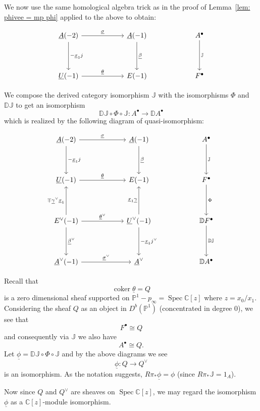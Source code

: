 \documentclass{amsart}
\theoremstyle{definition}
\newcommand{\CC} {{\mathbb C}}          %
\newcommand{\DD} {{\mathbb D}}
\newcommand{\JJ} {{\mathbb J}}
\newcommand{\PP}{\mathbb{P}}
\newcommand{\coker}{\operatorname{coker}}
\newcommand{\UL}[1]{\underline{#1}}
\newcommand{\Rpistar}{R\pi_{*}}
\begin{document}
We now use the same homological algebra trick as in the proof of
Lemma~\ref{lem: phivee = mp phi} applied to the above to obtain:

\[
\begin{tikzcd}[column sep=6em,row sep=4em]
  \UL{A}(-2)
    \arrow[d,"-\UL{x}_{1}j"]
    \arrow[r,"\UL{\sigma  }"]
  & \UL{A}(-1)
    \arrow[d,"\UL{\beta }"]
  & A^{\bullet }
    \arrow[d,"\JJ "]
  \\
  \UL{U}(-1)
    \arrow[r,"\UL{\theta }"]
  & E(-1)
  & F^{\bullet}
\end{tikzcd}
\]

We compose the derived category isomorphism $\JJ$ with the
isomorphisms $\Phi$ and $\DD \JJ$ to get an isomorphism
\[
\DD \JJ \circ \Phi \circ \JJ :A^{\bullet}\longrightarrow \DD A^{\bullet }
\]
which is realized by the following diagram of quasi-isomorphism:

\begin{equation}\label{eqn: big diagram}
\begin{tikzcd}[column sep=6em,row sep=4em]
  \UL{A}(-2)
    \arrow[d,"-\UL{x}_{1}j"]
    \arrow[r,"\UL{\sigma  }"]
  & \UL{A}(-1)
    \arrow[d,"\UL{\beta }"]
  & A^{\bullet }
    \arrow[d,"\JJ "]
  \\
  \UL{U}(-1)
    \arrow[r,"\UL{\theta }"]
  & E(-1)
  & F^{\bullet}
    \arrow[d,"\Phi"]\\
  E^{\vee}(-1)
    \arrow[d,"\UL{\beta}^{\vee}"]
    \arrow[u,"\mp \UL{\gamma}^{\vee}\UL{x}_{1}"]
    \arrow[r,"\UL{\theta }^{\vee}"]
  & \UL{U}^{\vee }(-1)
    \arrow[d,"-\UL{x}_{1}j^{\vee}"]
    \arrow[u,"\UL{x}_{1}\UL{\gamma }"]
  & \DD F^{\bullet}
    \arrow[d,"\DD \JJ "]\\
    \UL{A}^{\vee}(-1) 
    \arrow[r,"\UL{\sigma  }^{\vee}"]
  & \UL{A}^{\vee }
  & \DD A^{\bullet} 
\end{tikzcd}
\end{equation}

Recall that 
\[
\coker \UL{\theta} = Q
\]
is a zero dimensional sheaf supported on
$\PP^{1}-p_{\infty}=\operatorname{Spec}\CC [z]$ where
$z=x_{0}/x_{1}$. Considering the sheaf $Q$ as an object in
$D^{b}(\PP^{1})$ (concentrated in degree 0), we see that 
\[
F^{\bullet}\cong Q
\]
and consequently via $\JJ$ we also have 
\[
A^{\bullet}\cong Q.
\]
Let $\UL{\phi}=\DD \JJ \circ \Phi \circ \JJ$ and by the above diagrams
we see
\[
\UL{\phi}: Q\longrightarrow Q^{\vee}
\]
is an isomorphism. As the notation suggests, $\Rpistar \UL{\phi}=\phi$
(since $\Rpistar \JJ =1_{A}$).

Now since $Q$ and $Q^{\vee}$ are sheaves on $\operatorname{Spec}\CC
[z]$, we may regard the isomorphism $\UL{\phi }$ as a $\CC [z]$-module
isomorphism.
\end{document}
